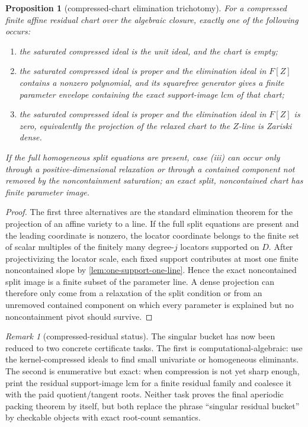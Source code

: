 \documentclass[11pt]{article}
\newtheorem{proposition}[proposition]{Proposition}
\theoremstyle{definition}
\theoremstyle{remark}
\newtheorem{remark}[remark]{Remark}
\begin{document}
\begin{proposition}[compressed-chart elimination trichotomy]
\label{prop:compressed-chart-elimination-trichotomy}
For a compressed finite affine residual chart over the algebraic closure, exactly
one of the following occurs:
\begin{enumerate}[label=\textup{(\roman*)},leftmargin=2.2em]
\item the saturated compressed ideal is the unit ideal, and the chart is empty;
\item the saturated compressed ideal is proper and the elimination ideal in $F[Z]$ contains a nonzero polynomial, and its
squarefree generator gives a finite parameter envelope containing the exact
support-image lcm of that chart;
\item the saturated compressed ideal is proper and the elimination ideal in $F[Z]$ is zero, equivalently the projection of the
relaxed chart to the $Z$-line is Zariski dense.
\end{enumerate}
If the full homogeneous split equations are present, case \textup{(iii)} can occur
only through a positive-dimensional relaxation or through a contained component
not removed by the noncontainment saturation; an exact split, noncontained chart
has finite parameter image.
\end{proposition}

\begin{proof}
The first three alternatives are the standard elimination theorem for the
projection of an affine variety to a line.  If the full split equations are
present and the leading coordinate is nonzero, the locator coordinate belongs to
the finite set of scalar multiples of the finitely many degree-$j$ locators
supported on $D$.  After projectivizing the locator scale, each fixed support
contributes at most one finite noncontained slope by
\cref{lem:one-support-one-line}.  Hence the exact noncontained split image is a
finite subset of the parameter line.  A dense projection can therefore only come
from a relaxation of the split condition or from an unremoved contained component
on which every parameter is explained but no noncontainment pivot should survive.
\end{proof}

\begin{remark}[compressed-residual status]
The singular bucket has now been reduced to two concrete certificate tasks.  The
first is computational-algebraic: use the kernel-compressed ideals to find small
univariate or homogeneous eliminants.  The second is enumerative but exact: when
compression is not yet sharp enough, print the residual support-image lcm for a
finite residual family and coalesce it with the paid quotient/tangent roots.
Neither task proves the final aperiodic packing theorem by itself, but both
replace the phrase ``singular residual bucket'' by checkable objects with exact
root-count semantics.
\end{remark}
\end{document}

